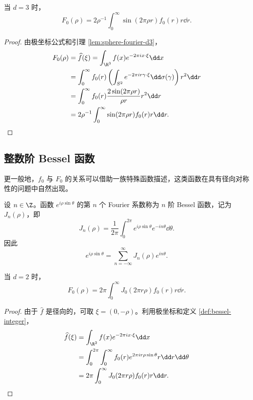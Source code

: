 \begin{proposition}\label{prop:radial-fourier-d3}
	当 $d=3$ 时，
	\[
	F_0(\rho)=2\rho^{-1}\int_0^\infty
	\sin(2\pi\rho r)f_0(r)r\dd r.
	\]
\end{proposition}

\begin{proof}
	由极坐标公式和引理 \ref{lem:sphere-fourier-d3}，
	\[
	\begin{aligned}
	F_0(\rho)
	&=\widehat f(\xi)
	=\int_{\R^3}f(x)e^{-2\pi i x\cdot\xi}\dd x\\
	&=\int_0^\infty f_0(r)
	\left(\int_{S^2}e^{-2\pi i r\gamma\cdot\xi}
	\dd\sigma(\gamma)\right)r^2\dd r\\
	&=\int_0^\infty f_0(r)
	\frac{2\sin(2\pi\rho r)}{\rho r}r^2\dd r\\
	&=2\rho^{-1}\int_0^\infty
	\sin(2\pi\rho r)f_0(r)r\dd r.
	\end{aligned}
	\]
\end{proof}

\subsection*{整数阶 Bessel 函数}

更一般地，$f_0$ 与 $F_0$ 的关系可以借助一族特殊函数描述，这类函数在具有径向对称性的问题中自然出现。

\begin{definition}\label{def:bessel-integer}
	设 $n\in\Z$。函数 $e^{i\rho\sin\theta}$ 的第 $n$ 个 Fourier 系数称为 $n$ 阶 Bessel 函数，记为 $J_n(\rho)$，即
	\[
	J_n(\rho)=\frac{1}{2\pi}\int_0^{2\pi}
	e^{i\rho\sin\theta}e^{-in\theta}\dd\theta.
	\]
	因此
	\[
	e^{i\rho\sin\theta}
	=\sum_{n=-\infty}^{\infty}J_n(\rho)e^{in\theta}.
	\]
\end{definition}

\begin{proposition}\label{prop:radial-fourier-d2}
	当 $d=2$ 时，
	\[
	F_0(\rho)=2\pi\int_0^\infty
	J_0(2\pi r\rho)f_0(r)r\dd r.
	\]
\end{proposition}

\begin{proof}
	由于 $\widehat f$ 是径向的，可取 $\xi=(0,-\rho)$。利用极坐标和定义 \ref{def:bessel-integer}，
	\[
	\begin{aligned}
	\widehat f(\xi)
	&=\int_{\R^2}f(x)e^{-2\pi i x\cdot\xi}\dd x\\
	&=\int_0^{2\pi}\int_0^\infty
	f_0(r)e^{2\pi i r\rho\sin\theta}r\dd r\dd\theta\\
	&=2\pi\int_0^\infty
	J_0(2\pi r\rho)f_0(r)r\dd r.
	\end{aligned}
	\]
\end{proof}

